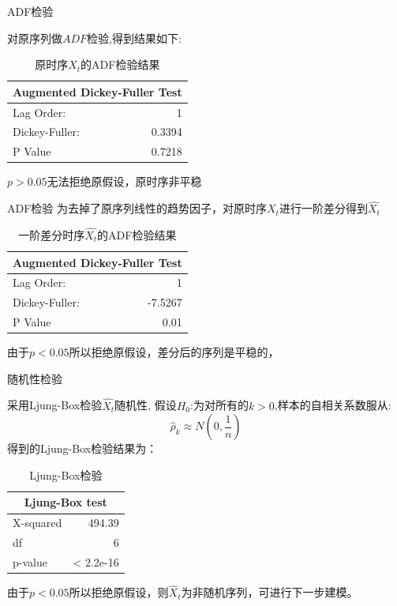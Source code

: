 \documentclass[10pt]{beamer}
\begin{document}
\begin{frame}{ADF检验}

  对原序列做\(ADF\)检验,得到结果如下:
  \begin{table}[htb]
    \centering
    \caption{原时序\(X_t\)的ADF检验结果}
      \begin{tabular}{l|r}
      \multicolumn{2}{c}{ Augmented Dickey-Fuller Test} \\
      \hline
      Lag Order: & 1 \\
      Dickey-Fuller: & 0.3394\\
      P Value  & 0.7218 \\
      \end{tabular}%
    \label{tab:ADF_raw}%
  \end{table}%
  \(p>0.05\)无法拒绝原假设，原时序非平稳
\end{frame}

\begin{frame}{ADF检验}
  为去掉了原序列线性的趋势因子，对原时序\(X_t\)进行一阶差分得到\(\hat{X_t}\)
  \begin{table}[H]
  \centering
  \caption{一阶差分时序\(\hat{X_t}\)的ADF检验结果}
    \begin{tabular}{l|r}
    \multicolumn{2}{c}{ Augmented Dickey-Fuller Test} \\
    \hline
    Lag Order: & 1 \\
    Dickey-Fuller: & -7.5267\\
    P Value  & 0.01 \\
    \end{tabular}%
  \label{tab:ADF_diff}%
\end{table}%
由于\(p<0.05\)所以拒绝原假设，差分后的序列是平稳的，
\end{frame}


\begin{frame}{随机性检验}

  采用Ljung-Box检验\(\hat{X_t}\)随机性,
  假设\(H_0\):为对所有的\(k>0\),样本的自相关系数服从:
  \[\hat{\rho}_k \approx N(0,\frac{1}{n})\]
  得到的Ljung-Box检验结果为：
  \begin{table}[H]
    \centering
    \caption{Ljung-Box检验}
      \begin{tabular}{l|r}
      \multicolumn{2}{c}{Ljung-Box test} \\
      \hline
      X-squared  & \multicolumn{1}{r}{494.39} \\
      df    & \multicolumn{1}{r}{6} \\
      p-value & < 2.2e-16 \\
      \end{tabular}%
    \label{tab:Ljung-Box}%
  \end{table}%

  由于\(p<0.05\)所以拒绝原假设，则\(\hat{X}_t\)为非随机序列，可进行下一步建模。
\end{frame}
\end{document}
